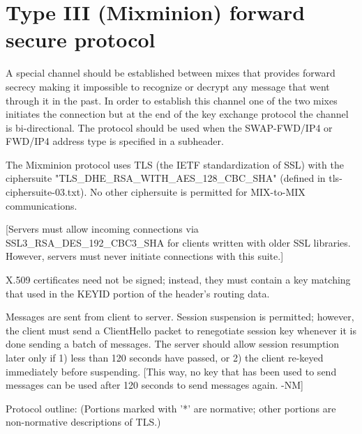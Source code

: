 \section{Type III (Mixminion) forward secure protocol}

A special channel should be established between mixes that provides
forward secrecy making it impossible to recognize or decrypt any
message that went through it in the past. In order to establish this
channel one of the two mixes initiates the connection but at the end
of the key exchange protocol the channel is bi-directional. The
protocol should be used when the SWAP-FWD/IP4 or FWD/IP4 address type
is specified in a subheader.

The Mixminion protocol uses TLS (the IETF standardization of SSL) with
the ciphersuite "TLS_DHE_RSA_WITH_AES_128_CBC_SHA" (defined in
tls-ciphersuite-03.txt).  No other ciphersuite is permitted for
MIX-to-MIX communications.

[Servers must allow incoming connections via SSL3_RSA_DES_192_CBC3_SHA
for clients written with older SSL libraries.  However, servers must
never initiate connections with this suite.]

X.509 certificates need not be signed; instead, they must contain
a key matching that used in the KEYID portion of the header's routing
data.  

Messages are sent from client to server.  Session suspension is
permitted; however, the client must send a ClientHello packet to
renegotiate session key whenever it is done sending a batch of
messages.  The server should allow session resumption later only if 1)
less than 120 seconds have passed, or 2) the client re-keyed
immediately before suspending.  [This way, no key that has been used
to send messages can be used after 120 seconds to send messages
again. -NM]

Protocol outline: (Portions marked with '*' are normative; other
portions are non-normative descriptions of TLS.)

